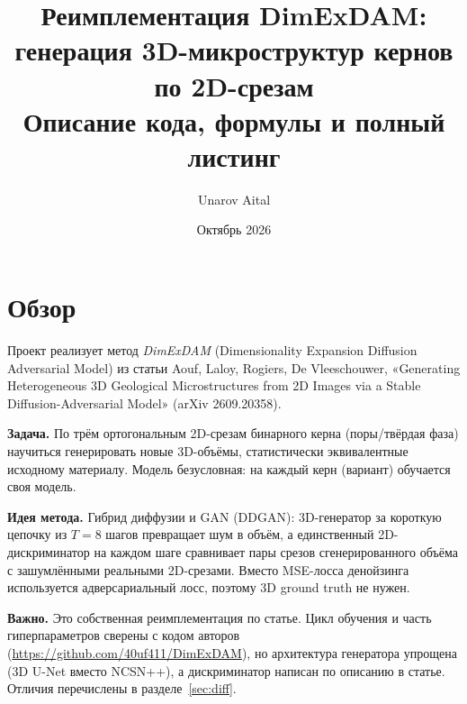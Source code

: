 \documentclass[11pt,a4paper]{article}
\title{Реимплементация DimExDAM:\\ генерация 3D-микроструктур кернов по 2D-срезам\\[4pt]
\large Описание кода, формулы и полный листинг}
\author{Unarov Aital}
\date{Октябрь 2026}
\begin{document}
\maketitle
\tableofcontents
\newpage

\section{Обзор}

Проект реализует метод \emph{DimExDAM} (Dimensionality Expansion Diffusion Adversarial Model) из статьи
Aouf, Laloy, Rogiers, De Vleeschouwer, «Generating Heterogeneous 3D Geological Microstructures from 2D
Images via a Stable Diffusion-Adversarial Model» (arXiv 2609.20358).

\textbf{Задача.} По трём ортогональным 2D-срезам бинарного керна (поры/твёрдая фаза) научиться
генерировать новые 3D-объёмы, статистически эквивалентные исходному материалу. Модель безусловная:
на каждый керн (вариант) обучается своя модель.

\textbf{Идея метода.} Гибрид диффузии и GAN (DDGAN): 3D-генератор за короткую цепочку из $T=8$ шагов
превращает шум в объём, а единственный 2D-дискриминатор на каждом шаге сравнивает пары срезов
сгенерированного объёма с зашумлёнными реальными 2D-срезами. Вместо MSE-лосса денойзинга используется
адверсариальный лосс, поэтому 3D ground truth не нужен.

\textbf{Важно.} Это собственная реимплементация по статье. Цикл обучения и часть гиперпараметров сверены с
кодом авторов (\url{https://github.com/40uf411/DimExDAM}), но архитектура генератора упрощена
(3D U-Net вместо NCSN++), а дискриминатор написан по описанию в статье. Отличия перечислены в
разделе~\ref{sec:diff}.
\end{document}
